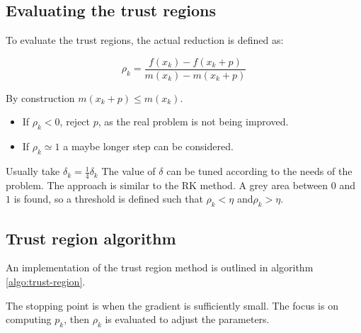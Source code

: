   \subsection{Evaluating the trust regions}
  To evaluate the trust regions, the actual reduction is defined as:

  $$\rho_k = \frac{f(x_k)-f(x_k+p)}{m(x_k)-m(x_k+p)}$$

  By construction $m(x_k+p) \leq m(x_k)$.

  \begin{multicols}{2}
    \begin{itemize}
      \item If $\rho_k < 0$, reject $p$, as the real problem is not being improved.
      \item If $\rho_k \simeq 1$ a maybe longer step can be considered.
    \end{itemize}
  \end{multicols}
  Usually take $\delta_k = \frac{1}{4} \delta_k$
  The value of $\delta$ can be tuned according to the needs of the problem.
  The approach is similar to  the RK method.
  A grey area  between $0$ and $1$ is found, so a threshold is defined such that $\rho_k < \eta$ and$\rho_k > \eta$.


  \subsection{Trust region algorithm}
  An implementation of the trust region method is outlined in algorithm \ref{algo:trust-region}.

  

  The stopping point is when the gradient is sufficiently small.
  The focus is on computing $p_k$, then $\rho_k$ is evaluated to adjust the parameters.
